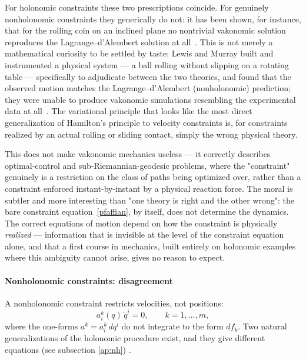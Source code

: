 For holonomic constraints these two prescriptions coincide. For
genuinely nonholonomic constraints they generically do not: it has
been shown, for instance, that for the rolling coin on an inclined
plane no nontrivial vakonomic solution reproduces the
Lagrange--d'Alembert solution at
all~\cite{zampieri}. This is not merely a
mathematical curiosity to be settled by taste: Lewis and Murray
built and instrumented a physical system --- a ball rolling without
slipping on a rotating table --- specifically to adjudicate between
the two theories, and found that the observed motion matches the
Lagrange--d'Alembert (nonholonomic) prediction; they were unable to
produce vakonomic simulations resembling the experimental data at
all~\cite{lewis+murray}. The variational principle that looks like
the most direct generalization of Hamilton's principle to velocity
constraints is, for constraints realized by an actual rolling or
sliding contact, simply the wrong physical theory.

This does not make vakonomic mechanics useless --- it correctly
describes optimal-control and sub-Riemannian-geodesic problems, where
the "constraint" genuinely is a restriction on the class of paths
being optimized over, rather than a constraint enforced
instant-by-instant by a physical reaction force. The moral is
subtler and more interesting than "one theory is right and the other
wrong": the bare constraint equation~\eqref{pfaffian}, by itself,
does not determine the dynamics. The correct equations of motion
depend on how the constraint is physically \emph{realized} ---
information that is invisible at the level of the constraint
equation alone, and that a first course in mechanics, built entirely
on holonomic examples where this ambiguity cannot arise, gives no
reason to expect.


\paragraph{Nonholonomic constraints: disagreement}
\label{nonholonomic}

A nonholonomic constraint restricts velocities, not positions:
\begin{equation}
  a^k_i(q)\,\dot q^i=0,\qquad k=1,\dots,m,
  \label{nonhol}
\end{equation}
where the one-forms $a^k=a^k_i\,dq^i$ do not integrate to the form $df_k$.
Two natural generalizations of the holonomic procedure exist, and they give
different equations (see subsection \ref{ap:nh}) .

